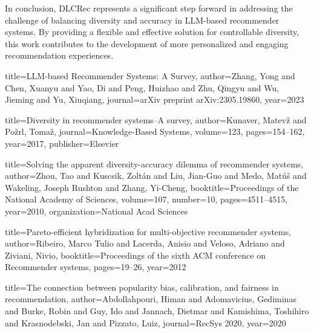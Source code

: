 \documentclass[12pt,letterpaper]{article}
\begin{document}
In conclusion, DLCRec represents a significant step forward in addressing the challenge of balancing diversity and accuracy in LLM-based recommender systems. By providing a flexible and effective solution for controllable diversity, this work contributes to the development of more personalized and engaging recommendation experiences.


\begin{thebibliography}{99}

title={LLM-based Recommender Systems: A Survey},
  author={Zhang, Yong and Chen, Xuanyu and Yao, Di and Peng, Huizhao and Zhu, Qingyu and Wu, Jieming and Yu, Xiuqiang},
  journal={arXiv preprint arXiv:2305.19860},
  year={2023}


title={Diversity in recommender systems--A survey},
  author={Kunaver, Matev{\v{z}} and Po{\v{z}}rl, Toma{\v{z}}},
  journal={Knowledge-Based Systems},
  volume={123},
  pages={154--162},
  year={2017},
  publisher={Elsevier}


title={Solving the apparent diversity-accuracy dilemma of recommender systems},
  author={Zhou, Tao and Kuscsik, Zolt{\'{a}}n and Liu, Jian-Guo and Medo, Mat{\'{u}}{\v{s}} and Wakeling, Joseph Rushton and Zhang, Yi-Cheng},
  booktitle={Proceedings of the National Academy of Sciences},
  volume={107},
  number={10},
  pages={4511--4515},
  year={2010},
  organization={National Acad Sciences}


title={Pareto-efficient hybridization for multi-objective recommender systems},
  author={Ribeiro, Marco Tulio and Lacerda, Anisio and Veloso, Adriano and Ziviani, Nivio},
  booktitle={Proceedings of the sixth ACM conference on Recommender systems},
  pages={19--26},
  year={2012}


title={The connection between popularity bias, calibration, and fairness in recommendation},
  author={Abdollahpouri, Himan and Adomavicius, Gediminas and Burke, Robin and Guy, Ido and Jannach, Dietmar and Kamishima, Toshihiro and Krasnodebski, Jan and Pizzato, Luiz},
  journal={RecSys 2020},
  year={2020}


\end{thebibliography}
\end{document}
